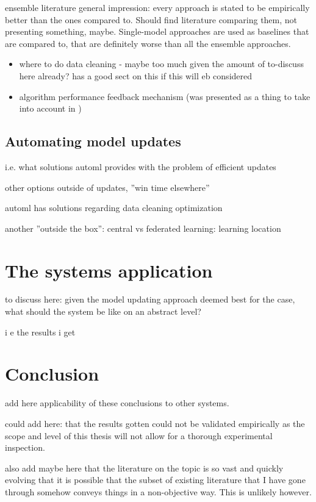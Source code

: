 ensemble literature general impression: every approach is stated to be empirically better than the ones compared to. Should find literature comparing them, not presenting something, maybe. Single-model approaches are used as baselines that are compared to, that are definitely worse than all the ensemble approaches.



\begin{itemize}
    \item where to do data cleaning - maybe too much given the amount of to-discuss here already? \cite{mlforstreamingsurvey} has a good sect on this if this will eb considered
    \item algorithm performance feedback mechanism (was presented as a thing to take into account in \cite{streamminingchallenges})
\end{itemize}

\section{Automating model updates}

i.e. what solutions automl provides with the problem of efficient updates

other options outside of updates, ''win time elsewhere''

automl has solutions regarding data cleaning optimization

another ''outside the box'': central vs federated learning: learning location

\chapter{The systems application}

to discuss here: given the model updating approach deemed best for the case, what should the system be like on an abstract level?

i e the results i get

\chapter{Conclusion}

add here applicability of these conclusions to other systems.

could add here: that the results gotten could not be validated empirically as the scope and level of this thesis will not allow for a thorough experimental inspection.

also add maybe here that the literature on the topic is so vast and quickly evolving that it is possible that the subset of existing literature that I have gone through somehow conveys things in a non-objective way. This is unlikely however.
